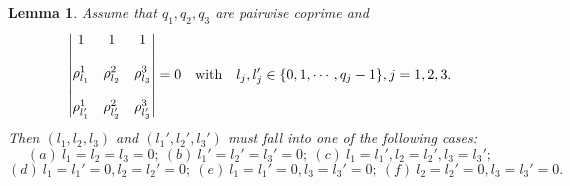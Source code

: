 \documentclass[12pt,letterpaper]{amsart}
\newtheorem{lemma}{Lemma}[section]
\begin{document}
\begin{lemma}\cite{liucpam}\label{lemcoprimeliucpam}
	Assume that $q_1,q_2,q_3$ are pairwise coprime and
	\begin{align}
		\begin{vmatrix}
			1 & 1 & 1 \\
			\\
			\rho^1_{l_1} & \rho^2_{l_2} &\rho^3_{l_3}\\
			\\
			\rho^1_{l_1'} & \rho^2_{l_2'} &\rho^3_{l_3'}
		\end{vmatrix}= 0\quad {\rm with}\quad l_j,l_j'\in\{0,1,\cdots,q_j-1\},j=1,2,3.\nonumber
	\end{align}
	Then $(l_1,l_2,l_3)$ and $(l_1',l_2',l_3')$ must fall into one of the following cases:
	\[(a)~l_1=l_2=l_3=0;~(b)~l_1'=l_2'=l_3'=0;~(c)~l_1=l_1',l_2=l_2',l_3=l_3';\]\[(d)~l_1=l_1'=0,l_2=l_2'=0;~(e)~l_1=l_1'=0,l_3=l_3'=0;~(f)~l_2=l_2'=0,l_3=l_3'=0.\]
\end{lemma}
\end{document}

